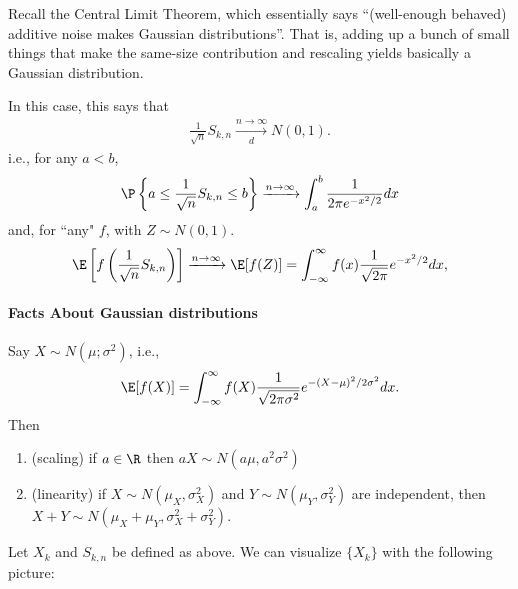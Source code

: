 Recall the Central Limit Theorem, which essentially says 
``(well-enough behaved) additive noise makes Gaussian distributions''.  
That is, adding up a bunch of small things that make the same-size contribution and rescaling yields basically a Gaussian distribution.

In this case, this says that 
$$\begin{aligned}
    \frac{1}{\sqrt{n}}S_{k,n}\xrightarrow[d]{n\to\infty} N(0,1).
\end{aligned}$$
i.e., for any $a<b$, 
$$\begin{aligned}
    \P\left\{a\leq\frac{1}{\sqrt{n}}S_{k,n}\leq b\right\}\xrightarrow{n\to\infty}\int_a^b \frac{1}{2\pi e^{-x^2/2}}dx
\end{aligned}$$
and, for ``any" $f$, 
with $Z\sim N(0,1)$.
$$\begin{aligned}
    \E\left[f\left(\frac{1}{\sqrt{n}}S_{k,n}\right)\right]\xrightarrow{n\to\infty}\E[f(Z)]=\int_{-\infty}^\infty f(x)\frac{1}{\sqrt{2\pi}}e^{-x^2/2}dx,
\end{aligned}$$ 

\paragraph{Facts About Gaussian distributions}
Say $X\sim N(\mu;\sigma^2)$, i.e., 
$$\begin{aligned}
    \E[f(X)]=\int_{-\infty}^\infty f(X)\frac{1}{\sqrt{2\pi\sigma^2}}e^{-(X-\mu)^2/2\sigma^2}dx.
\end{aligned}$$  
Then 
\begin{enumerate}
    \item (scaling) if $a\in\R$ then $aX\sim N(a\mu,a^2\sigma^2)$
    \item (linearity) if $X\sim N(\mu_X,\sigma_X^2)$ and $Y\sim N(\mu_Y,\sigma_Y^2)$ are independent, then $X+Y\sim N(\mu_X+\mu_Y,\sigma_X^2+\sigma_Y^2)$.
\end{enumerate}

Let $X_k$ and $S_{k,n}$ be defined as above.  
We can visualize $\{X_k\}$ with the following picture:

\begin{center}
\end{center}

